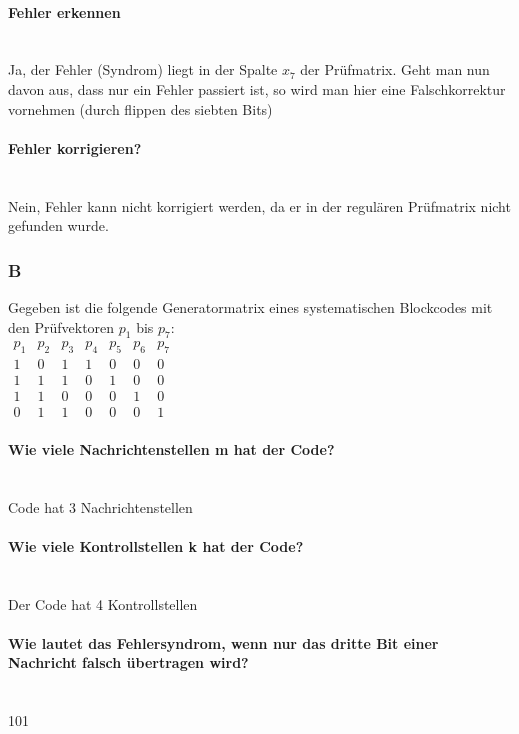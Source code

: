 \paragraph{Fehler erkennen}\mbox{}\\
Ja, der Fehler (Syndrom) liegt in der Spalte $x_7$ der Prüfmatrix.
Geht man nun davon aus, dass nur ein Fehler passiert ist, so wird man hier eine Falschkorrektur vornehmen
(durch flippen des siebten Bits)

\paragraph{Fehler korrigieren?}\mbox{}\\
Nein, Fehler kann nicht korrigiert werden, da er in der regulären Prüfmatrix nicht gefunden wurde.

\subsubsection{B}
Gegeben ist die folgende Generatormatrix eines systematischen Blockcodes mit den Prüfvektoren $p_1$ bis $p_7$:\\
$\begin{matrix}
    p_1 & p_2 & p_3 & p_4 & p_5 & p_6 & p_7\\
    1 & 0 & 1 & 1 & 0 & 0 & 0\\
    1 & 1 & 1 & 0 & 1 & 0 & 0\\
    1 & 1 & 0 & 0 & 0 & 1 & 0\\
    0 & 1 & 1 & 0 & 0 & 0 & 1
\end{matrix}$

\paragraph{Wie viele Nachrichtenstellen m hat der Code?}\mbox{}\\
Code hat 3 Nachrichtenstellen

\paragraph{Wie viele Kontrollstellen k hat der Code?}\mbox{}\\
Der Code hat 4 Kontrollstellen

\paragraph{Wie lautet das Fehlersyndrom, wenn nur das dritte Bit einer Nachricht falsch übertragen wird?}\mbox{}\\
101

